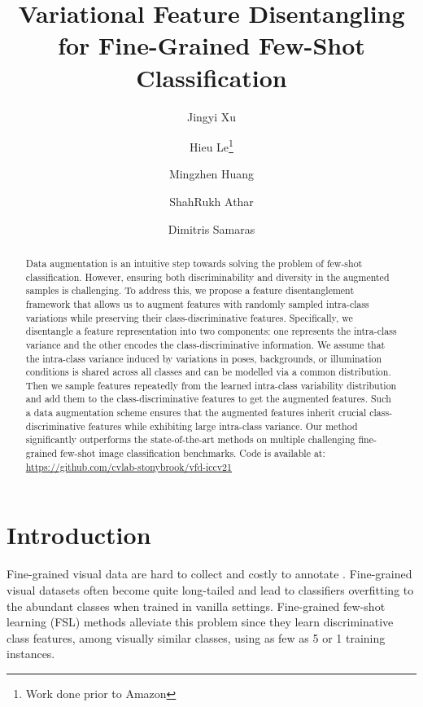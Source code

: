 \documentclass[10pt,twocolumn,letterpaper]{article}
\begin{document}
\title{Variational Feature Disentangling for Fine-Grained Few-Shot Classification}


\author[1]{Jingyi Xu}
\author[2]{Hieu Le\thanks{Work done prior to Amazon}}
\author[1]{Mingzhen Huang}
\author[1]{ShahRukh Athar}
\author[1]{Dimitris Samaras}




\maketitle
\ificcvfinal\thispagestyle{empty}\fi

\begin{abstract}
Data augmentation is an intuitive step towards solving the problem of few-shot classification. However, ensuring both discriminability and diversity in the augmented samples is challenging. To address this, we propose a feature disentanglement framework that allows us to augment features with randomly sampled intra-class variations while preserving their class-discriminative features. Specifically, we disentangle a feature representation into two components: one represents the intra-class variance and the other encodes the class-discriminative information. We assume that the intra-class variance induced by variations in poses, backgrounds, or illumination conditions is shared across all classes and can be modelled via a common distribution. Then we sample features repeatedly from the learned intra-class variability distribution and add them to the class-discriminative features to get the augmented features. Such a data augmentation scheme ensures that the augmented features inherit crucial class-discriminative features while exhibiting large intra-class variance. Our method significantly outperforms the state-of-the-art methods on multiple challenging fine-grained few-shot image classification benchmarks. Code is available at: \url{https://github.com/cvlab-stonybrook/vfd-iccv21}

\end{abstract}

\section{Introduction}



Fine-grained visual data are hard to collect and costly to annotate \cite{cub,nab,dog}. 
Fine-grained visual datasets often become quite long-tailed 
and lead to classifiers overfitting to the abundant classes when trained in vanilla settings. Fine-grained few-shot learning (FSL) methods alleviate this problem since they learn discriminative class features, among visually similar classes, using as few as 5 or 1 training instances.     
\end{document}
